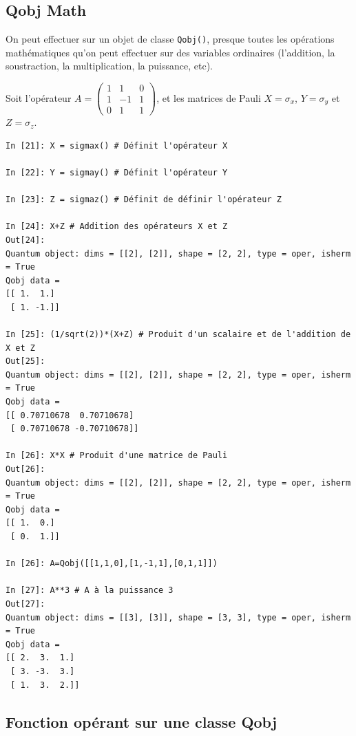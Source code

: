 \begin{itemize}
\subsection{Qobj Math}

On peut effectuer sur un objet de classe \texttt{Qobj()}, presque toutes les 
opérations mathématiques qu'on peut effectuer sur des variables ordinaires 
(l'addition, la soustraction, la multiplication, la puissance, etc).\\
\begin{example}
Soit l'opérateur $A =\begin{pmatrix}1&1&0\\1&-1&1\\0&1&1\end{pmatrix}$, et les 
matrices de Pauli $X = \sigma_x$, $Y=\sigma_y$ et $Z = \sigma_z$.\\
\begin{lstlisting}
In [21]: X = sigmax() # Définit l'opérateur X

In [22]: Y = sigmay() # Définit l'opérateur Y

In [23]: Z = sigmaz() # Définit de définir l'opérateur Z

In [24]: X+Z # Addition des opérateurs X et Z
Out[24]: 
Quantum object: dims = [[2], [2]], shape = [2, 2], type = oper, isherm = True
Qobj data =
[[ 1.  1.]
 [ 1. -1.]]

In [25]: (1/sqrt(2))*(X+Z) # Produit d'un scalaire et de l'addition de X et Z
Out[25]: 
Quantum object: dims = [[2], [2]], shape = [2, 2], type = oper, isherm = True
Qobj data =
[[ 0.70710678  0.70710678]
 [ 0.70710678 -0.70710678]]
 
In [26]: X*X # Produit d'une matrice de Pauli
Out[26]: 
Quantum object: dims = [[2], [2]], shape = [2, 2], type = oper, isherm = True
Qobj data =
[[ 1.  0.]
 [ 0.  1.]]

In [26]: A=Qobj([[1,1,0],[1,-1,1],[0,1,1]])

In [27]: A**3 # A à la puissance 3
Out[27]: 
Quantum object: dims = [[3], [3]], shape = [3, 3], type = oper, isherm = True
Qobj data =
[[ 2.  3.  1.]
 [ 3. -3.  3.]
 [ 1.  3.  2.]]
 \end{lstlisting}
\end{example}

\subsection{Fonction opérant sur une classe Qobj}


\end{itemize}
